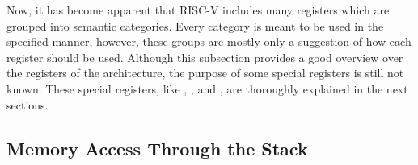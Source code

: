 Now, it has become apparent that RISC-V includes many registers which are grouped into semantic categories.
Every category is meant to be used in the specified manner, however, these groups are mostly only a suggestion of how each register should be used.
Although this subsection provides a good overview over the registers of the architecture, the purpose of some special registers is still not known.
These special registers, like , , and , are thoroughly explained in the next sections.

\subsection{Memory Access Through the Stack}\label{sec:riscv_stack}

%
%
%

